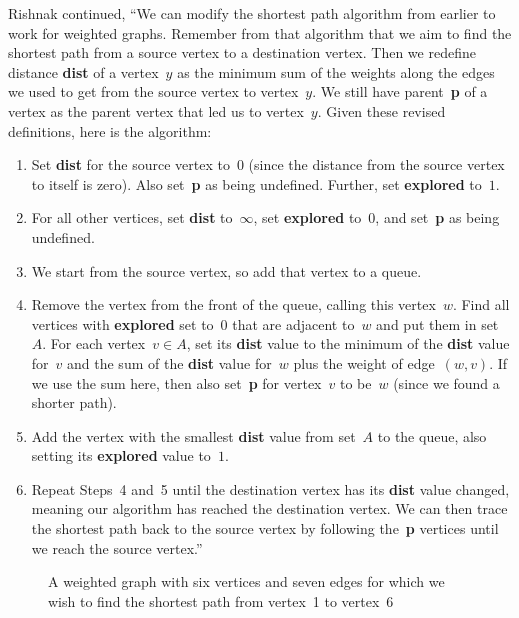 Rishnak continued, ``We can modify the shortest path algorithm from earlier to work for weighted graphs. Remember from that algorithm that we aim to find the shortest path from a source vertex to a destination vertex.  Then we redefine distance \textbf{dist} of a vertex~$y$ as the minimum sum of the weights along the edges we used to get from the source vertex to vertex~$y$. We still have parent~\textbf{p} of a vertex as the parent vertex that led us to vertex~$y$. Given these revised definitions, here is the algorithm:
\begin{enumerate}
\item Set \textbf{dist} for the source vertex to~0 (since the distance from the source vertex to itself is zero). Also set~\textbf{p} as being undefined.  Further, set \textbf{explored} to~$1$.
\item For all other vertices, set \textbf{dist} to~$\infty$, set \textbf{explored} to~$0$, and set~\textbf{p} as being undefined.
\item We start from the source vertex, so add that vertex to a queue.
\item Remove the vertex from the front of the queue, calling this vertex~$w$. Find all vertices with \textbf{explored} set to~$0$ that are adjacent to~$w$ and put them in set~$A$. For each vertex~$v\in A$, set its \textbf{dist} value to the minimum of the \textbf{dist} value for~$v$ and the sum of the \textbf{dist} value for~$w$ plus the weight of edge~$(w,v)$. If we use the sum here, then also set~\textbf{p} for vertex~$v$ to be~$w$ (since we found a shorter path).
\item Add the vertex with the smallest \textbf{dist} value from set~$A$ to the queue, also setting its \textbf{explored} value to~$1$.
\item Repeat Steps~4 and~5 until the destination vertex has its \textbf{dist} value changed, meaning our algorithm has reached the destination vertex. We can then trace the shortest path back to the source vertex by following the~\textbf{p} vertices until we reach the source vertex.''
\end{enumerate}


\begin{figure}
\begin{center}
\caption{A weighted graph with six vertices and seven edges for which we wish to find the shortest path from vertex~1 to vertex~6}\label{12g8}
\end{center}
\end{figure}

